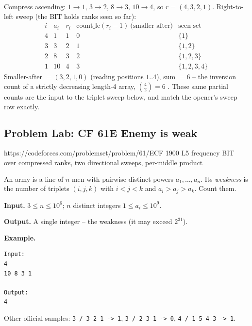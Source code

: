 \begin{tracebox}[Smaller-after and inversions on a=(10,8,3,1)]
Compress ascending: \(1{\to}1,\,3{\to}2,\,8{\to}3,\,10{\to}4\), so
\(r=(4,3,2,1)\).  Right-to-left sweep (the BIT holds ranks seen so far):
\[
\renewcommand{\arraystretch}{1.15}
\begin{array}{c|c|c|c|c}
i & a_i & r_i & \text{count\_le}(r_i-1)\ \text{(smaller after)} & \text{seen set}\\ \hline
4 & 1  & 1 & 0 & \{1\}\\
3 & 3  & 2 & 1 & \{1,2\}\\
2 & 8  & 3 & 2 & \{1,2,3\}\\
1 & 10 & 4 & 3 & \{1,2,3,4\}
\end{array}
\]
Smaller-after \(=(3,2,1,0)\) (reading positions \(1..4\)), sum \(=6\) -- the
inversion count of a strictly decreasing length-4 array, \(\binom{4}{2}=6\)
\checkmark.  These same partial counts are the input to the triplet sweep
below, and match the opener's sweep row exactly.
\end{tracebox}

\subsection{Problem Lab: CF 61E Enemy is weak}

  {https://codeforces.com/problemset/problem/61/E}{CF 1900 L5}
  {frequency BIT over compressed ranks, two directional sweeps, per-middle product}

\begin{problemstatement}
An army is a line of \(n\) men with pairwise distinct powers
\(a_1,\dots,a_n\).  Its \emph{weakness} is the number of triplets
\((i,j,k)\) with \(i<j<k\) and \(a_i>a_j>a_k\).  Count them.

\textbf{Input.} \(3\le n\le 10^6\); \(n\) distinct integers
\(1\le a_i\le 10^9\).

\textbf{Output.} A single integer -- the weakness (it may exceed \(2^{31}\)).

\textbf{Example.}
\begin{verbatim}
Input:
4
10 8 3 1

Output:
4
\end{verbatim}
Other official samples: \texttt{3 / 3 2 1 -> 1},
\texttt{3 / 2 3 1 -> 0}, \texttt{4 / 1 5 4 3 -> 1}.
\end{problemstatement}

